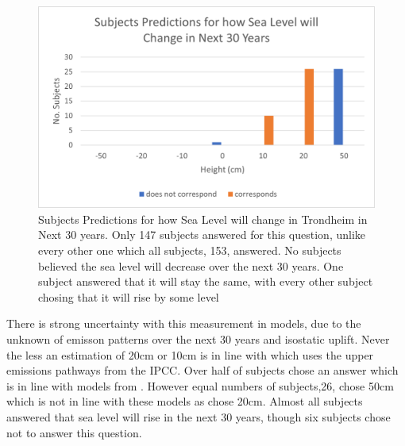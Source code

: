 \paragraph{}

\begin{figure}[h]
    \centering
    \includegraphics{fig_results/slr-future.png}
    \caption{Subjects Predictions for how Sea Level will change in Trondheim in Next 30 years. Only 147 subjects answered for this question, unlike every other one which all subjects, 153, answered. No subjects believed the sea level will decrease over the next 30 years. One subject answered that it will stay the same, with every other subject chosing that it will rise by some level }
    \label{fig:my_label}
\end{figure}

There is strong uncertainty with this measurement in models, due to the unknown of emisson patterns over the next 30 years and isostatic uplift. Never the less an estimation of 20cm or 10cm is in line with \cite{kartverket_se_2021} which uses the upper emissions pathways from the IPCC. Over half of subjects chose an answer which is in line with models from \cite{kartverket_se_2021}. However equal numbers of subjects,26, chose 50cm which is not in line with these models as chose 20cm. Almost all subjects answered that sea level will rise in the next 30 years, though six subjects chose not to answer this question.  

